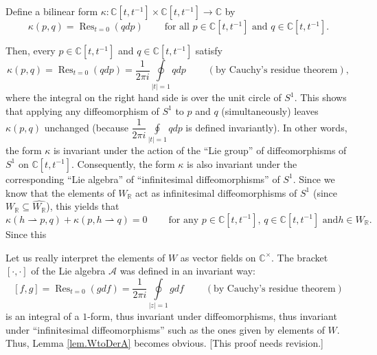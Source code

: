 \documentclass[etingof-lie.tex]{subfiles}
\begin{document}
\begin{noncompile}
Define a bilinear form $\kappa:\mathbb{C}\left[  t,t^{-1}\right]
\times\mathbb{C}\left[  t,t^{-1}\right]  \rightarrow\mathbb{C}$ by%
\[
\kappa\left(  p,q\right)  =\operatorname*{Res}\nolimits_{t=0}\left(
qdp\right)  \ \ \ \ \ \ \ \ \ \ \text{for all }p\in\mathbb{C}\left[
t,t^{-1}\right]  \text{ and }q\in\mathbb{C}\left[  t,t^{-1}\right]  .
\]

\end{noncompile}

\begin{noncompile}
Then, every $p\in\mathbb{C}\left[  t,t^{-1}\right]  $ and $q\in\mathbb{C}%
\left[  t,t^{-1}\right]  $ satisfy%
\[
\kappa\left(  p,q\right)  =\operatorname*{Res}\nolimits_{t=0}\left(
qdp\right)  =\dfrac{1}{2\pi i}\oint\limits_{\left\vert t\right\vert
=1}qdp\ \ \ \ \ \ \ \ \ \ \left(  \text{by Cauchy's residue theorem}\right)
,
\]
where the integral on the right hand side is over the unit circle of $S^{1}$.
This shows that applying any diffeomorphism of $S^{1}$ to $p$ and $q$
(simultaneously) leaves $\kappa\left(  p,q\right)  $ unchanged (because
$\dfrac{1}{2\pi i}\oint\limits_{\left\vert t\right\vert =1}qdp$ is defined
invariantly). In other words, the form $\kappa$ is invariant under the action
of the ``Lie group'' of diffeomorphisms of $S^{1}$ on $\mathbb{C}\left[
t,t^{-1}\right]  $. Consequently, the form $\kappa$ is also invariant under
the corresponding ``Lie algebra'' of ``infinitesimal diffeomorphisms'' of
$S^{1}$. Since we know that the elements of $W_{\mathbb{R}}$ act as
infinitesimal diffeomorphisms of $S^{1}$ (since $W_{\mathbb{R}}\subseteq
\widehat{W_{\mathbb{R}}}$), this yields that%
\[
\kappa\left(  h\rightharpoonup p,q\right)  +\kappa\left(  p,h\rightharpoonup
q\right)  =0\ \ \ \ \ \ \ \ \ \ \text{for any }p\in\mathbb{C}\left[
t,t^{-1}\right]  \text{, }q\in\mathbb{C}\left[  t,t^{-1}\right]  \text{ and
}h\in W_{\mathbb{R}}.
\]
Since this
\end{noncompile}

Let us really interpret the elements of $W$ as vector fields on $\mathbb{C}%
^{\times}$. The bracket $\left[  \cdot,\cdot\right]  $ of the Lie algebra
$\mathcal{A}$ was defined in an invariant way:%
\[
\left[  f,g\right]  =\operatorname*{Res}\nolimits_{t=0}\left(  gdf\right)
=\dfrac{1}{2\pi i}\oint\limits_{\left\vert z\right\vert =1}%
gdf\ \ \ \ \ \ \ \ \ \ \left(  \text{by Cauchy's residue theorem}\right)
\]
is an integral of a $1$-form, thus invariant under diffeomorphisms, thus
invariant under ``infinitesimal diffeomorphisms'' such as the ones given by
elements of $W$. Thus, Lemma \ref{lem.WtoDerA} becomes obvious. [This proof
needs revision.]
\end{document}
